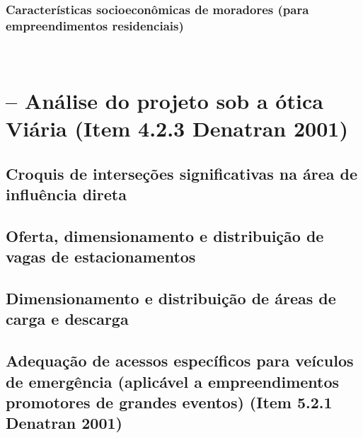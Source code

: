 \documentclass[]{article}
\begin{document}
\hypertarget{caracteruxedsticas-socioeconuxf4micas-de-moradores-para-empreendimentos-residenciais}{%
\subsubsection{Características socioeconômicas de moradores (para
empreendimentos
residenciais)}\label{caracteruxedsticas-socioeconuxf4micas-de-moradores-para-empreendimentos-residenciais}}

~

\hypertarget{anuxe1lise-do-projeto-sob-a-uxf3tica-viuxe1ria-item-4.2.3-denatran-2001}{%
\section{-- Análise do projeto sob a ótica Viária (Item 4.2.3 Denatran
2001)}\label{anuxe1lise-do-projeto-sob-a-uxf3tica-viuxe1ria-item-4.2.3-denatran-2001}}

\hypertarget{croquis-de-interseuxe7uxf5es-significativas-na-uxe1rea-de-influuxeancia-direta}{%
\subsection{Croquis de interseções significativas na área de influência
direta}\label{croquis-de-interseuxe7uxf5es-significativas-na-uxe1rea-de-influuxeancia-direta}}

\hypertarget{oferta-dimensionamento-e-distribuiuxe7uxe3o-de-vagas-de-estacionamentos}{%
\subsection{Oferta, dimensionamento e distribuição de vagas de
estacionamentos}\label{oferta-dimensionamento-e-distribuiuxe7uxe3o-de-vagas-de-estacionamentos}}

\hypertarget{dimensionamento-e-distribuiuxe7uxe3o-de-uxe1reas-de-carga-e-descarga}{%
\subsection{Dimensionamento e distribuição de áreas de carga e
descarga}\label{dimensionamento-e-distribuiuxe7uxe3o-de-uxe1reas-de-carga-e-descarga}}

\hypertarget{adequauxe7uxe3o-de-acessos-especuxedficos-para-veuxedculos-de-emerguxeancia-aplicuxe1vel-a-empreendimentos-promotores-de-grandes-eventos-item-5.2.1-denatran-2001}{%
\subsection{Adequação de acessos específicos para veículos de emergência
(aplicável a empreendimentos promotores de grandes eventos) (Item 5.2.1
Denatran
2001)}\label{adequauxe7uxe3o-de-acessos-especuxedficos-para-veuxedculos-de-emerguxeancia-aplicuxe1vel-a-empreendimentos-promotores-de-grandes-eventos-item-5.2.1-denatran-2001}}
\end{document}
